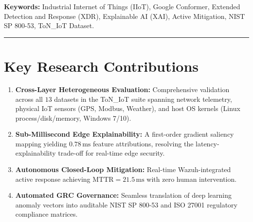 \documentclass[11pt,a4paper]{article}
\begin{document}
\begin{abstract}
\end{abstract}

\vspace{1.2em}
\noindent\textbf{Keywords:} Industrial Internet of Things (IIoT), Google Conformer, Extended Detection and Response (XDR), Explainable AI (XAI), Active Mitigation, NIST SP 800-53, ToN\_IoT Dataset.

\vspace{2em}
\hrule
\vspace{1.5em}

\section*{Key Research Contributions}
\begin{enumerate}
    \item \textbf{Cross-Layer Heterogeneous Evaluation:} Comprehensive validation across all $13$ datasets in the ToN\_IoT suite spanning network telemetry, physical IoT sensors (GPS, Modbus, Weather), and host OS kernels (Linux process/disk/memory, Windows 7/10).
    \item \textbf{Sub-Millisecond Edge Explainability:} A first-order gradient saliency mapping yielding $0.78\,\text{ms}$ feature attributions, resolving the latency-explainability trade-off for real-time edge security.
    \item \textbf{Autonomous Closed-Loop Mitigation:} Real-time Wazuh-integrated active response achieving $\text{MTTR} = 21.5\,\text{ms}$ with zero human intervention.
    \item \textbf{Automated GRC Governance:} Seamless translation of deep learning anomaly vectors into auditable NIST SP 800-53 and ISO 27001 regulatory compliance matrices.
\end{enumerate}
\end{document}
